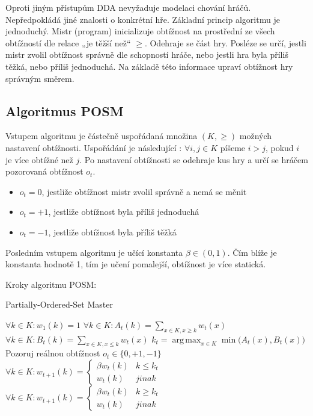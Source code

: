Oproti jiným přístupům DDA nevyžaduje modelaci chování hráčů. Nepředpokládá jiné znalosti o konkrétní hře. 
Základní princip algoritmu je jednoduchý. Mistr (program) inicializuje obtížnost na prostřední ze všech obtížností dle relace „je těžší než“ $\geq$. Odehraje se část hry. Posléze se určí, jestli mistr zvolil obtížnost správně dle schopností hráče, nebo jestli hra byla příliš těžká, nebo příliš jednoduchá. Na základě této informace upraví obtížnost hry správným směrem.

\subsection{Algoritmus POSM}

Vstupem algoritmu je částečně uspořádaná množina $(K,\geq)$ možných nastavení obtížnosti. Uspořádání je následující : $\forall i,j \in K$ píšeme $i>j$, pokud $i$ je více obtížné než $j$.
Po nastavení obtížnosti se odehraje kus hry a určí se hráčem pozorovaná obtížnost $o_t$.

\begin{itemize}
	\item $o_t=0$, jestliže obtížnost mistr zvolil správně a nemá se měnit
	\item $o_t=+1$, jestliže obtížnost byla příliš jednoduchá
	\item $o_t=-1$, jestliže obtížnost byla příliš těžká
\end{itemize}
	
Posledním vstupem algoritmu je učící konstanta $\beta\in(0,1)$. Čím blíže je konstanta hodnotě 1, tím je učení pomalejší, obtížnost je více statická.

Kroky algoritmu POSM:

\begin{algorithm}
\caption{Partially-Ordered-Set Master}
\label{posm}
\begin{algorithmic}[1]
\State $\forall k \in K : w_1(k) = 1$
	 \State $\forall k \in K : A_t(k) = \sum_{x \in K, x \geq k} w_t(x)$
	 \State $\forall k \in K : B_t(k) = \sum_{x \in K, x \leq k} w_t(x)$
	 \State $k_t = \operatorname{arg\,max}_{x \in K} \min({A_t(x), B_t(x))}$
	 \State Pozoruj reálnou obtížnost $o_t\in \{0,+1,-1\}$
	   \State $\forall k \in K : w_{t+1}(k) = 
		                                        \begin{cases}
																						   \beta w_t(k) & k \leq k_t \\
																							 w_t(k) & jinak
																						\end{cases}
						 $
   \EndIf
	   \State $\forall k \in K : w_{t+1}(k) = 
		                                        \begin{cases}
																						   \beta w_t(k) & k \geq k_t \\
																							 w_t(k) & jinak
																						\end{cases}
						 $
   \EndIf
\EndFor
\end{algorithmic}
\end{algorithm}

